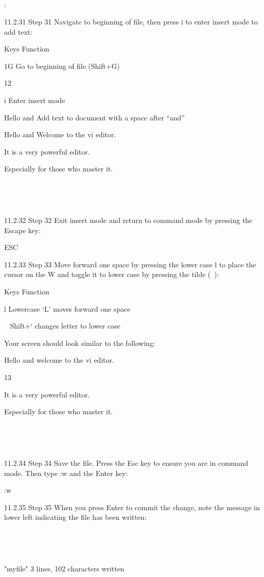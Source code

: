~

~

~

~

:%

11.2.31 Step 31
Navigate to beginning of file, then press i to enter insert mode to add text:

Keys Function

1G Go to beginning of file (Shift+G)

12



i Enter insert mode

Hello and Add text to document with a space after “and”

Hello and Welcome to the vi editor.

It is a very powerful editor.

Especially for those who master it.

~

~

11.2.32 Step 32
Exit insert mode and return to command mode by pressing the Escape key:

ESC

11.2.33 Step 33
Move forward one space by pressing the lower case l to place the cursor on the W and toggle it
to lower case by pressing the tilde (~):

Keys Function

l Lowercase ‘L’ moves forward one space

~ Shift+` changes letter to lower case

Your screen should look similar to the following:

Hello and welcome to the vi editor.

13



It is a very powerful editor.

Especially for those who master it.

~

~

11.2.34 Step 34
Save the file. Press the Esc key to ensure you are in command mode. Then type :w and the
Enter key:

:w

11.2.35 Step 35
When you press Enter to commit the change, note the message in lower left indicating the file
has been written:

~

~

"myfile" 3 lines, 102 characters written

